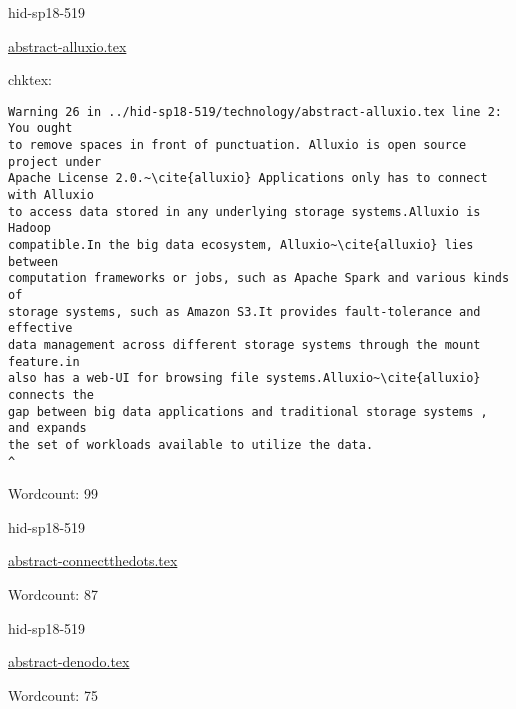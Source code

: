 

\begin{IU}

hid-sp18-519

\href{https://github.com/cloudmesh-community/hid-sp18-519/blob/master//technology/abstract-alluxio.tex}{abstract-alluxio.tex}

 
chktex:
\begin{tiny}
\begin{verbatim}
Warning 26 in ../hid-sp18-519/technology/abstract-alluxio.tex line 2: You ought
to remove spaces in front of punctuation. Alluxio is open source project under
Apache License 2.0.~\cite{alluxio} Applications only has to connect with Alluxio
to access data stored in any underlying storage systems.Alluxio is Hadoop
compatible.In the big data ecosystem, Alluxio~\cite{alluxio} lies between
computation frameworks or jobs, such as Apache Spark and various kinds of
storage systems, such as Amazon S3.It provides fault-tolerance and effective
data management across different storage systems through the mount feature.in
also has a web-UI for browsing file systems.Alluxio~\cite{alluxio} connects the
gap between big data applications and traditional storage systems , and expands
the set of workloads available to utilize the data.
^
\end{verbatim}
\end{tiny}

Wordcount: 99

\end{IU}



\begin{IU}

hid-sp18-519

\href{https://github.com/cloudmesh-community/hid-sp18-519/blob/master//technology/abstract-connectthedots.tex}{abstract-connectthedots.tex}

 

Wordcount: 87

\end{IU}



\begin{IU}

hid-sp18-519

\href{https://github.com/cloudmesh-community/hid-sp18-519/blob/master//technology/abstract-denodo.tex}{abstract-denodo.tex}

 

Wordcount: 75

\end{IU}


